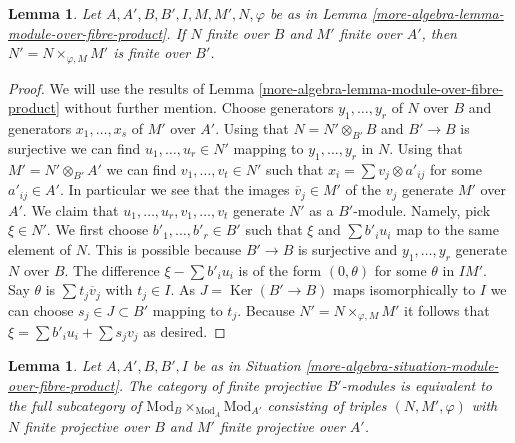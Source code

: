 \documentclass{amsart}
\theoremstyle{plain}
\newtheorem{lemma}[subsection]{Lemma}
\theoremstyle{definition}
\theoremstyle{remark}
\numberwithin{equation}{subsection}
\def\Ker{\mathop{\mathrm{Ker}}}
\begin{document}
\begin{lemma}
\label{more-algebra-lemma-finite-module-over-fibre-product}
Let $A, A', B, B', I, M, M', N, \varphi$ be as in
Lemma \ref{more-algebra-lemma-module-over-fibre-product}.
If $N$ finite over $B$ and $M'$ finite over $A'$, then
$N' = N \times_{\varphi, M} M'$ is finite over $B'$.
\end{lemma}

\begin{proof}
We will use the results of
Lemma \ref{more-algebra-lemma-module-over-fibre-product}
without further mention. Choose generators $y_1, \ldots, y_r$ of $N$ over $B$
and generators $x_1, \ldots, x_s$ of $M'$ over $A'$. Using that
$N = N' \otimes_{B'} B$ and $B' \to B$ is surjective we can find
$u_1, \ldots, u_r \in N'$ mapping to $y_1, \ldots, y_r$ in $N$.
Using that $M' = N' \otimes_{B'} A'$ we can find $v_1, \ldots, v_t \in N'$
such that $x_i = \sum v_j \otimes a'_{ij}$ for some $a'_{ij} \in A'$.
In particular we see that the images $\overline{v}_j \in M'$
of the $v_j$ generate $M'$ over $A'$.
We claim that $u_1, \ldots, u_r, v_1, \ldots, v_t$
generate $N'$ as a $B'$-module. Namely, pick $\xi \in N'$. We first choose
$b'_1, \ldots, b'_r \in B'$ such that $\xi$ and $\sum b'_i u_i$ map
to the same element of $N$. This is possible because $B' \to B$
is surjective and $y_1, \ldots, y_r$ generate $N$ over $B$.
The difference $\xi - \sum b'_i u_i$ is of the form $(0, \theta)$
for some $\theta$ in $IM'$. Say $\theta$ is $\sum t_j\overline{v}_j$
with $t_j \in I$. As $J = \Ker(B' \to B)$ maps isomorphically to $I$
we can choose $s_j \in J \subset B'$ mapping to $t_j$.
Because $N' = N \times_{\varphi, M} M'$ it follows
that $\xi = \sum b'_i u_i + \sum s_j v_j$ as desired.
\end{proof}


\begin{lemma}
\label{more-algebra-lemma-finitely-presented-module-over-fibre-product}
Let $A, A', B, B', I$ be as in
Situation \ref{more-algebra-situation-module-over-fibre-product}.
The category of finite projective $B'$-modules
is equivalent to the full subcategory
of $\text{Mod}_B \times_{\text{Mod}_A} \text{Mod}_{A'}$
consisting of triples $(N, M', \varphi)$
with $N$ finite projective over $B$ and $M'$ finite projective over $A'$.
\end{lemma}
\end{document}
